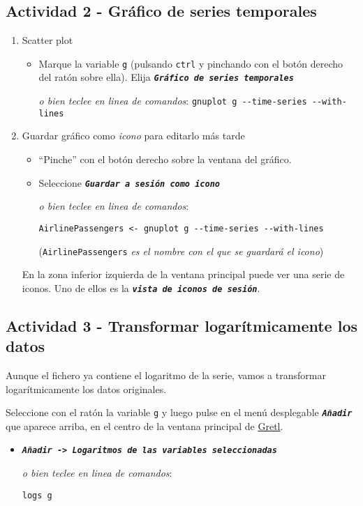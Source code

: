 \documentclass[11pt]{article}
\begin{document}
\subsection{Actividad 2 - Gráfico de series temporales}
\label{sec:org13b1741}
\begin{enumerate}
\item Scatter plot
\label{sec:org5b191c0}
\begin{itemize}
\item Marque la variable \texttt{g} (pulsando \texttt{ctrl} y pinchando con el botón
derecho del ratón sobre ella). Elija \textbf{\emph{\texttt{Gráfico de series temporales}}}

{\vspace{1pt} \footnotesize \color{gray!70!black}
\emph{o bien teclee en linea de comandos}: \texttt{gnuplot g -{}-{}time-series -{}-{}with-lines}
}
\end{itemize}

\item Guardar gráfico como \emph{icono} para editarlo más tarde
\label{sec:org71f8dd5}
\begin{itemize}
\item ``Pinche'' con el botón derecho sobre la ventana del gráfico.
\item Seleccione \textbf{\emph{\texttt{Guardar a sesión como icono}}}

{\vspace{1pt} \footnotesize \color{gray!70!black} \color{gray!70!black}
\emph{o bien teclee en linea de comandos}:
\begin{verbatim}
AirlinePassengers <- gnuplot g --time-series --with-lines
\end{verbatim}
(\texttt{AirlinePassengers} \emph{es el nombre con el que se guardará el icono})
}
\end{itemize}

En la zona inferior izquierda de la ventana principal puede ver una
serie de iconos. Uno de ellos es la \textbf{\emph{\texttt{vista de iconos de sesión}}}.
\end{enumerate}


\subsection{Actividad 3 - Transformar logarítmicamente los datos}
\label{sec:orgf259a70}
Aunque el fichero ya contiene el logaritmo de la serie, vamos a
transformar logarítmicamente los datos originales.

Seleccione con el ratón la variable \texttt{g} y luego pulse en el menú desplegable \textbf{\emph{\texttt{Añadir}}} que aparece arriba, en el centro de la
ventana principal de \href{https://gretl.sourceforge.net/es.html}{Gretl}.
\begin{itemize}
\item \textbf{\emph{\texttt{Añadir -> Logaritmos de las variables seleccionadas}}}

{\vspace{0pt} \footnotesize \color{gray!70!black}
\emph{o bien teclee en linea de comandos}: 
\begin{verbatim}
logs g
\end{verbatim}
}
\end{itemize}
\end{document}
